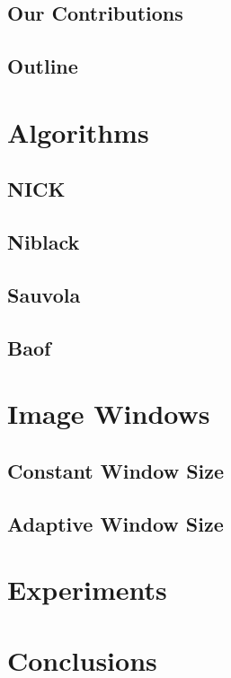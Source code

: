 \documentclass[sigconf]{acmart}
\begin{document}
\subsection{Our Contributions}

\subsection{Outline}

\section{Algorithms}

\subsection{NICK}

\subsection{Niblack}

\subsection{Sauvola}

\subsection{Baof}

\section{Image Windows}

\subsection{Constant Window Size}

\subsection{Adaptive Window Size}

\section{Experiments}

\section{Conclusions}



\end{document}
